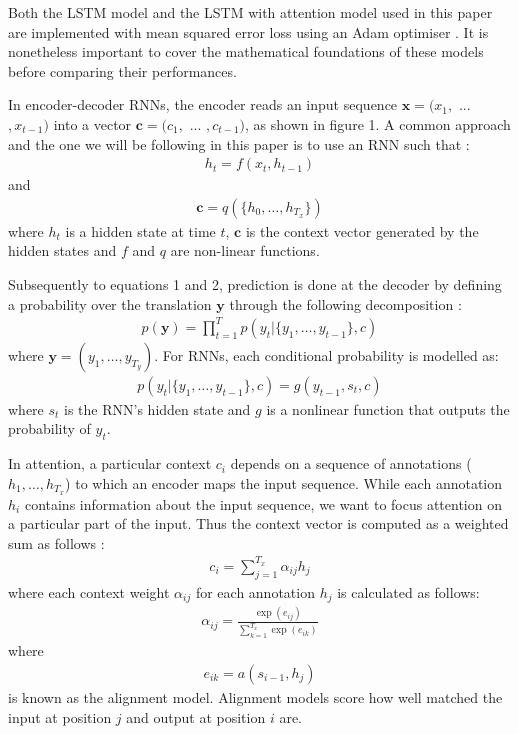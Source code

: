 \documentclass{article}
\begin{document}
Both the LSTM model and the LSTM with attention model used in this paper are implemented with mean squared error loss using an Adam optimiser \cite{kingma2014adam}. It is nonetheless important to cover the mathematical foundations of these models before comparing their performances.

In encoder-decoder RNNs, the encoder reads an input sequence $\textbf{x} = (x_1,$ ... $, x_{t-1})$ into a vector $\textbf{c} = (c_1,$ ... $, c_{t-1})$, as shown in figure 1. A common approach and the one we will be following in this paper is to use an RNN such that \cite{bahdanau2014neural}:
\begin{align}
    h_t = f(x_t, h_{t-1})
\end{align}
and
\begin{align}
    \textbf{c} = q(\{h_0, \dots , h_{T_x}\})
\end{align}
where $h_t$ is a hidden state at time $t$, $\textbf{c}$ is the context vector generated by the hidden states  and $f$ and $q$ are non-linear functions. 

Subsequently to equations 1 and 2, prediction is done at the decoder by defining a probability over the translation $\textbf{y}$ through the following decomposition \cite{bahdanau2014neural}:
\begin{align}
    p(\textbf{y}) = \prod_{t=1}^T p(y_t | \{y_1, \dots , y_{t-1}\}, c)
\end{align}
where $\textbf{y} = (y_1, \dots , y_{T_y})$. For RNNs, each conditional probability is modelled as:
\begin{align}
    p(y_t | \{y_1, \dots , y_{t-1}\}, c) = g(y_{t-1},s_t,c)
\end{align}
where $s_t$ is the RNN's hidden state and $g$ is a nonlinear function that outputs the probability of $y_t$. 

In attention, a particular context $c_i$ depends on a sequence of annotations ($h_1, \dots , h_{T_x}$) to which an encoder maps the input sequence. While each annotation $h_i$ contains information about the input sequence, we want to focus attention on a particular part of the input. Thus the context vector is computed as a weighted sum as follows \cite{bahdanau2014neural}:
\begin{align}
    c_i = \sum_{j=1}^{T_x} \alpha_{ij}h_j
\end{align}
where each context weight $\alpha_{ij}$ for each annotation $h_j$ is calculated as follows:
\begin{align}
    \alpha_{ij} = \frac{\exp(e_{ij})}{\sum_{k=1}^{T_x} \exp(e_{ik})}
\end{align}
where
\begin{align}
    e_{ik} = a(s_{i-1},h_j)
\end{align}
is known as the alignment model. Alignment models score how well matched the input at position $j$ and output at position $i$ are.
\end{document}

